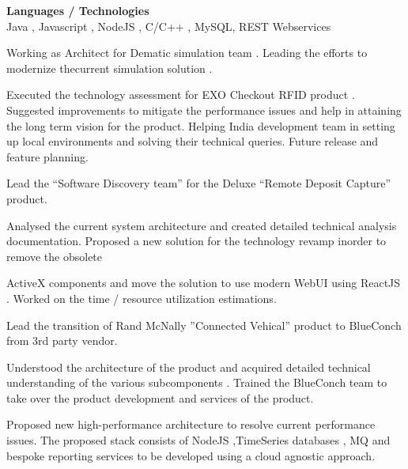 \documentclass[a4,10pt]{cv4tw}
\begin{document}
        {\textbf{Languages / Technologies} \\Java , Javascript , NodeJS , C/C++ , MySQL, REST Webservices}
        {
            \begin{missions}
            \item  Working as Architect for Dematic simulation team . Leading the efforts to modernize thecurrent simulation solution .
            \item Executed the technology assessment for EXO Checkout RFID product . Suggested improvements to mitigate the performance issues and help in attaining the long term vision for the product. Helping India development team in setting up local environments and solving their technical queries. Future release and feature planning.
            \item Lead the “Software Discovery team” for the Deluxe “Remote Deposit Capture” product.
            \item Analysed the current system architecture and created detailed technical analysis documentation. Proposed a new solution for the technology revamp inorder to remove the obsolete
            \item ActiveX components and move the solution to use modern WebUI using ReactJS . Worked on the time / resource utilization estimations.
            \item Lead the transition of Rand McNally ”Connected Vehical” product to BlueConch from 3rd party vendor.
            \item Understood the architecture of the product and acquired detailed technical understanding of the various subcomponents . Trained the BlueConch team to take over the product development and services of the product.
            \item Proposed new high-performance architecture to resolve current performance issues. The proposed stack consists of NodeJS ,TimeSeries databases , MQ and bespoke reporting services to be developed using a cloud agnostic approach.
            \end{missions}
            }
\end{document}
